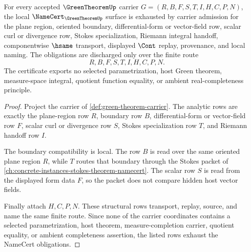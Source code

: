 \begin{theorem}\label{thm:green-theorem-namecert-obligations}
For every accepted $\GreenTheoremUp$ carrier $G=(R,B,F,S,T,I,H,C,P,N)$, the local $\NameCert_{\GreenTheoremUp}$ surface is exhausted by carrier admission for the plane region, oriented boundary, differential-form or vector-field row, scalar curl or divergence row, Stokes specialization, Riemann integral handoff, componentwise $\hsame$ transport, displayed $\Cont$ replay, provenance, and local naming. The obligations are discharged only over the finite route
$$
R,B,F,S,T,I,H,C,P,N .
$$
The certificate exports no selected parametrization, host Green theorem, measure-space integral, quotient function equality, or ambient real-completeness principle.
\end{theorem}
\begin{proof}
Project the carrier of \autoref{def:green-theorem-carrier}. The analytic rows are exactly the plane-region row $R$, boundary row $B$, differential-form or vector-field row $F$, scalar curl or divergence row $S$, Stokes specialization row $T$, and Riemann handoff row $I$.

The boundary compatibility is local. The row $B$ is read over the same oriented plane region $R$, while $T$ routes that boundary through the Stokes packet of \autoref{ch:concrete-instances-stokes-theorem-namecert}. The scalar row $S$ is read from the displayed form data $F$, so the packet does not compare hidden host vector fields.

Finally attach $H,C,P,N$. These structural rows transport, replay, source, and name the same finite route. Since none of the carrier coordinates contains a selected parametrization, host theorem, measure-completion carrier, quotient equality, or ambient completeness assertion, the listed rows exhaust the NameCert obligations.
\end{proof}

